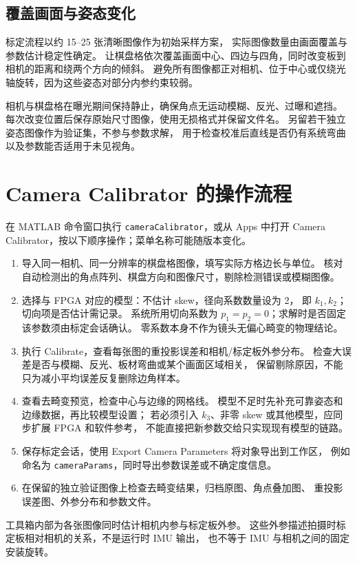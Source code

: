 \subsection{覆盖画面与姿态变化}
标定流程以约 15--25 张清晰图像作为初始采样方案，
实际图像数量由画面覆盖与参数估计稳定性确定。
让棋盘格依次覆盖画面中心、四边与四角，同时改变板到相机的距离和绕两个方向的倾斜。
避免所有图像都正对相机、位于中心或仅绕光轴旋转，因为这些姿态对部分内参约束较弱。

相机与棋盘格在曝光期间保持静止，确保角点无运动模糊、反光、过曝和遮挡。
每次改变位置后保存原始尺寸图像，使用无损格式并保留文件名。
另留若干独立姿态图像作为验证集，不参与参数求解，
用于检查校准后直线是否仍有系统弯曲以及参数能否适用于未见视角。

\section{Camera Calibrator 的操作流程}
在 MATLAB 命令窗口执行 \texttt{cameraCalibrator}，或从 Apps 中打开
Camera Calibrator，按以下顺序操作；菜单名称可能随版本变化\cite{matlab-calibrator}。
\begin{enumerate}
\item 导入同一相机、同一分辨率的棋盘格图像，填写实际方格边长与单位。
核对自动检测出的角点阵列、棋盘方向和图像尺寸，剔除检测错误或模糊图像。
\item 选择与 FPGA 对应的模型：不估计 skew，径向系数数量设为 2，
即 $k_1,k_2$；切向项是否估计需记录。
系统所用切向系数为 $p_1=p_2=0$；求解时是否固定该参数须由标定会话确认。
零系数本身不作为镜头无偏心畸变的物理结论。
\item 执行 Calibrate，查看每张图的重投影误差和相机/标定板外参分布。
检查大误差是否与模糊、反光、板材弯曲或某个画面区域相关，
保留剔除原因，不能只为减小平均误差反复删除边角样本。
\item 查看去畸变预览，检查中心与边缘的网格线。
模型不足时先补充可靠姿态和边缘数据，再比较模型设置；
若必须引入 $k_3$、非零 skew 或其他模型，应同步扩展 FPGA 和软件参考，
不能直接把新参数交给只实现现有模型的链路。
\item 保存标定会话，使用 Export Camera Parameters 将对象导出到工作区，
例如命名为 \texttt{cameraParams}，同时导出参数误差或不确定度信息。
\item 在保留的独立验证图像上检查去畸变结果，归档原图、角点叠加图、
重投影误差图、外参分布和参数文件。
\end{enumerate}

工具箱内部为各张图像同时估计相机内参与标定板外参。
这些外参描述拍摄时标定板相对相机的关系，不是运行时 IMU 输出，
也不等于 IMU 与相机之间的固定安装旋转。

